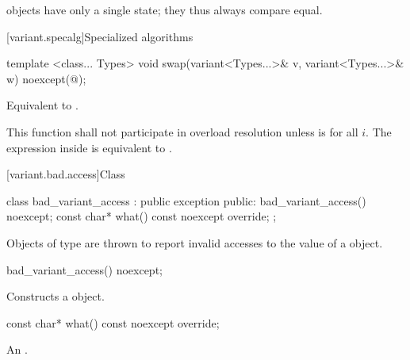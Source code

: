 \begin{itemdescr}
\pnum
\begin{note}  objects have only a single state; they thus always compare equal.\end{note}
\end{itemdescr}


[variant.specalg]{Specialized algorithms}

%
\begin{itemdecl}
template <class... Types>
  void swap(variant<Types...>& v, variant<Types...>& w) noexcept(@\seebelow@);
\end{itemdecl}

\begin{itemdescr}
\pnum
\effects Equivalent to .

\pnum
\remarks This function shall not participate in overload resolution
unless 
is  for all $i$.
The expression inside  is equivalent to .
\end{itemdescr}

%
[variant.bad.access]{Class }

\begin{codeblock}
class bad_variant_access : public exception {
public:
  bad_variant_access() noexcept;
  const char* what() const noexcept override;
};
\end{codeblock}

\pnum
Objects of type  are thrown to report invalid
accesses to the value of a  object.

%
\begin{itemdecl}
bad_variant_access() noexcept;
\end{itemdecl}

\begin{itemdescr}
\pnum
Constructs a  object.
\end{itemdescr}

%
\begin{itemdecl}
const char* what() const noexcept override;
\end{itemdecl}

\begin{itemdescr}
\pnum
\returns An  \ntbs.
\end{itemdescr}

